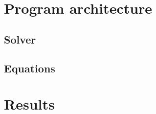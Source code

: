 \newcommand{\german}{false} %
\newcommand{\coloredTitlePage}{true} %
\newcommand{\company}{false}
\newcommand{\ECE}{true}

\usepackage{hyperref}

\makeglossaries

%

\makeatletter
\newcommand{\myscope}[2] %
{\draw[thick,rotate=#2] (#1) circle (12pt)
 (#1) ++(-0.35,-0.1) -- ++(0.3,0.3) --++(0,-0.3)-- ++(0.3,0.3) --++(0,-0.3);
}
\newcommand{\plotwidth}[0]{
0.7\textwidth
}

\newcommand{\costumPlotWidth}[0]{
\textwidth
}





%

\frontmatter
\renewcommand{\thepage}{\Roman{page}}



\tableofcontents
\printglossary
\mainmatter
\chapter{Program architecture}
\section{Solver}

\section{Equations}

\chapter{Results}


\newpage
